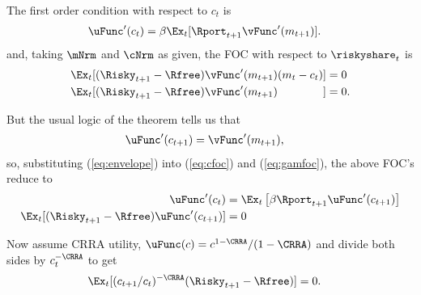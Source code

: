 \documentclass{handout}
\begin{document}
The first order condition with respect to $c_{t}$ is
\begin{equation}\begin{gathered}\begin{aligned}
      \uFunc^{\prime}(c_{t}) & =  \beta \Ex_{t}[ \Rport_{t+1}\vFunc^{\prime}({m}_{t+1})] \label{eq:cfoc}.
    \end{aligned}\end{gathered}\end{equation}
and, taking $\mNrm$ and $\cNrm$ as given, the FOC with respect to $\riskyshare_{t}$ is
\begin{equation}\begin{gathered}\begin{aligned}
      \Ex_{t}[(\Risky_{t+1}-\Rfree)\vFunc^{\prime}({m}_{t+1})({m}_{t}-{c}_{t})] & =  0 
      \\      \Ex_{t}[(\Risky_{t+1}-\Rfree)\vFunc^{\prime}({m}_{t+1})\phantom{({m}_{t}-{c}_{t})}] & =  0 \label{eq:gamfoc}
      .
    \end{aligned}\end{gathered}\end{equation}

But the usual logic of the  theorem tells us that 
\begin{equation}\begin{gathered}\begin{aligned}
      \uFunc^{\prime}(c_{t+1}) & =  \vFunc^{\prime}(m_{t+1}), \label{eq:envelope}
    \end{aligned}\end{gathered}\end{equation}
so, substituting (\ref{eq:envelope}) into (\ref{eq:cfoc}) and (\ref{eq:gamfoc}), the above FOC's reduce to
\begin{equation}\begin{gathered}\begin{aligned}
      \uFunc^{\prime}(c_{t}) & =  \Ex_{t}\left[\beta  \Rport_{t+1} \uFunc^{\prime}({c}_{t+1})\right] \label{eq:ceuler}
      \\      \Ex_{t}[(\Risky_{t+1}-\Rfree)\uFunc^{\prime}({c}_{t+1})] & =  0 %
    \end{aligned}\end{gathered}\end{equation}

Now assume CRRA utility, $\uFunc(c) = c^{1-\CRRA}/(1-\CRRA)$ and divide both 
sides by $c_{t}^{-\CRRA}$ to get
\begin{equation}\begin{gathered}\begin{aligned}
      \Ex_{t}[(c_{t+1}/c_{t})^{-\CRRA}(\Risky_{t+1}-\Rfree)] & =  0. \label{eq:gameulernew}
    \end{aligned}\end{gathered}\end{equation}
\end{document}

